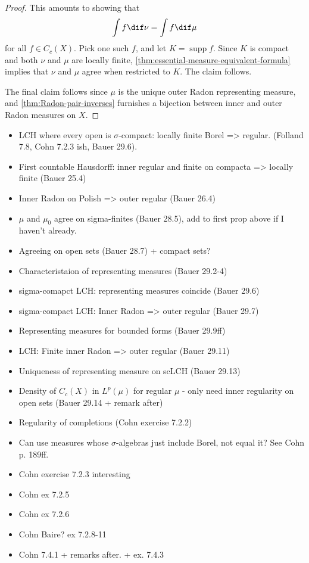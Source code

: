 \documentclass[article, a4paper, 11pt, oneside]{memoir}
\numberwithin{equation}{chapter}
\DeclareMathOperator{\supp}{supp}
\begin{document}
\begin{proof}
    This amounts to showing that
    \begin{equation*}
        \int f \dif \nu = \int f \dif \mu
    \end{equation*}
    for all $f \in C_c(X)$. Pick one such $f$, and let $K = \supp f$. Since $K$ is compact and both $\nu$ and $\mu$ are locally finite, \cref{thm:essential-measure-equivalent-formula} implies that $\nu$ and $\mu$ agree when restricted to $K$. The claim follows.

    The final claim follows since $\mu$ is the unique outer Radon representing measure, and \cref{thm:Radon-pair-inverses} furnishes a bijection between inner and outer Radon measures on $X$. %
\end{proof}



\begin{itemize}
    \item LCH where every open is $\sigma$-compact: locally finite Borel => regular. (Folland 7.8, Cohn 7.2.3 ish, Bauer 29.6).
    \item First countable Hausdorff: inner regular and finite on compacta => locally finite (Bauer 25.4)
    \item Inner Radon on Polish => outer regular (Bauer 26.4)
    \item $\mu$ and $\mu_0$ agree on sigma-finites (Bauer 28.5), add to first prop above if I haven't already.
    \item Agreeing on open sets (Bauer 28.7) + compact sets?
    \item Characteristaion of representing measures (Bauer 29.2-4)
    \item sigma-comapct LCH: representing measures coincide (Bauer 29.6)
    \item sigma-compact LCH: Inner Radon => outer regular (Bauer 29.7)
    \item Representing measures for bounded forms (Bauer 29.9ff)
    \item LCH: Finite inner Radon => outer regular (Bauer 29.11)
    \item Uniqueness of representing measure on scLCH (Bauer 29.13)
    \item Density of $C_c(X)$ in $L^p(\mu)$ for regular $\mu$ - only need inner regularity on open sets (Bauer 29.14 + remark after)
    \item Regularity of completions (Cohn exercise 7.2.2)
    \item Can use measures whose $\sigma$-algebras just include Borel, not equal it? See Cohn p. 189ff.
    \item Cohn exercise 7.2.3 interesting
    \item Cohn ex 7.2.5
    \item Cohn ex 7.2.6
    \item Cohn Baire? ex 7.2.8-11
    \item Cohn 7.4.1 + remarks after. + ex. 7.4.3
\end{itemize}




\nocite{*}

\printbibliography
\end{document}
